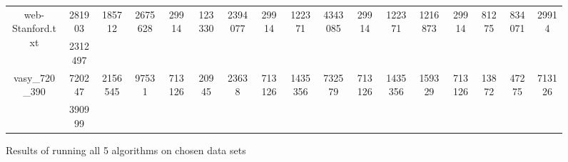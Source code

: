 \documentclass[../master/master.tex]{subfiles}
\begin{document}
\begin{figure}
\begin{adjustbox}{angle=90}
\begin{tabular}{ |c|c||c|c|c||c|c|c||c|c|c||c|c|c||c|c|c|| }
\hline
\multirow{2}{3.4em}{web-Stanford.txt} & 281903 & \multirow{2}{3.4em}{185712} & \multirow{2}{3.4em}{2675628} & \multirow{2}{3.4em}{29914} & \multirow{2}{3.4em}{123330} & \multirow{2}{3.4em}{2394077} & \multirow{2}{3.4em}{29914} & \multirow{2}{3.4em}{122371} & \multirow{2}{3.4em}{4343085} & \multirow{2}{3.4em}{29914} & \multirow{2}{3.4em}{122371} & \multirow{2}{3.4em}{1216873} & \multirow{2}{3.4em}{29914} & \multirow{2}{3.4em}{81275} & \multirow{2}{3.4em}{834071} & \multirow{2}{3.4em}{29914} \\
\cline{2-2}
 & 2312497  &  &  &  &  &  &  &  &  &  &  &  &  &  &  &  \\
\hline
\multirow{2}{3.4em}{vasy\_720\_390} & 720247 & \multirow{2}{3.4em}{2156545} & \multirow{2}{3.4em}{97531} & \multirow{2}{3.4em}{713126} & \multirow{2}{3.4em}{20945} & \multirow{2}{3.4em}{23638} & \multirow{2}{3.4em}{713126} & \multirow{2}{3.4em}{1435356} & \multirow{2}{3.4em}{732579} & \multirow{2}{3.4em}{713126} & \multirow{2}{3.4em}{1435356} & \multirow{2}{3.4em}{159329} & \multirow{2}{3.4em}{713126} & \multirow{2}{3.4em}{13872} & \multirow{2}{3.4em}{47275} & \multirow{2}{3.4em}{713126} \\
\cline{2-2}
 & 390999  &  &  &  &  &  &  &  &  &  &  &  &  &  &  &  \\
\hline
\end{tabular}
\end{adjustbox}
\caption{Results of running all 5 algorithms on chosen data sets}
\label{fig:data}
\end{figure}
\end{document}
